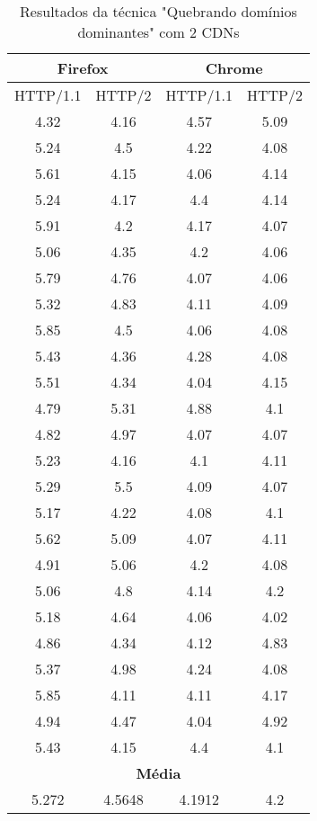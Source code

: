 \begin{table}[h]
	\centering
	\caption{Resultados da técnica "Quebrando domínios dominantes" com 2 CDNs}
	\label{resultados-quebrandodominiosdominantes-2}
	\begin{tabular}{cccc}
		\hline
		\multicolumn{2}{c}{\textbf{Firefox}} & \multicolumn{2}{c}{\textbf{Chrome}} \\
		\hline
		HTTP/1.1 & HTTP/2 & HTTP/1.1 & HTTP/2 \\
		\hline
		4.32 & 4.16 & 4.57 & 5.09 \\
		5.24 & 4.5  & 4.22 & 4.08 \\
		5.61 & 4.15 & 4.06 & 4.14 \\
		5.24 & 4.17 & 4.4  & 4.14 \\
		5.91 & 4.2  & 4.17 & 4.07 \\
		5.06 & 4.35 & 4.2  & 4.06 \\
		5.79 & 4.76 & 4.07 & 4.06 \\
		5.32 & 4.83 & 4.11 & 4.09 \\
		5.85 & 4.5  & 4.06 & 4.08 \\
		5.43 & 4.36 & 4.28 & 4.08 \\
		5.51 & 4.34 & 4.04 & 4.15 \\
		4.79 & 5.31 & 4.88 & 4.1  \\
		4.82 & 4.97 & 4.07 & 4.07 \\
		5.23 & 4.16 & 4.1  & 4.11 \\
		5.29 & 5.5  & 4.09 & 4.07 \\
		5.17 & 4.22 & 4.08 & 4.1  \\
		5.62 & 5.09 & 4.07 & 4.11 \\
		4.91 & 5.06 & 4.2  & 4.08 \\
		5.06 & 4.8  & 4.14 & 4.2  \\
		5.18 & 4.64 & 4.06 & 4.02 \\
		4.86 & 4.34 & 4.12 & 4.83 \\
		5.37 & 4.98 & 4.24 & 4.08 \\
		5.85 & 4.11 & 4.11 & 4.17 \\
		4.94 & 4.47 & 4.04 & 4.92 \\
		5.43 & 4.15 & 4.4  & 4.1  \\
		\hline
		\multicolumn{4}{c}{\textbf{Média}} \\
		5.272 & 4.5648 & 4.1912 & 4.2 \\
		\hline
	\end{tabular}
\end{table}